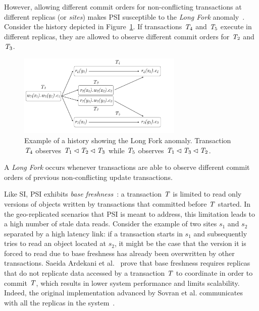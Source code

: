 However, allowing different commit orders for non-conflicting transactions at different replicas (or \emph{sites}) makes PSI susceptible to the \emph{Long Fork} anomaly~\citep{psi-intro}. Consider the history depicted in Figure~\ref{fig:long_fork_history}. If transactions $\mathit{T}_4$ and $\mathit{T}_5$ execute in different replicas, they are allowed to observe different commit orders for $\mathit{T}_2$ and $\mathit{T}_3$.

\begin{figure}[h]
  \centering
  \includegraphics[width=0.7\textwidth]{figures/long_fork_hist.pdf}
  \caption{Example of a history showing the Long Fork anomaly. Transaction $\mathit{T}_4$ observes $\mathit{T}_1 \lhd \mathit{T}_2 \lhd \mathit{T}_3$ while $\mathit{T}_5$ observes $\mathit{T}_1 \lhd \mathit{T}_3 \lhd \mathit{T}_2$.}
  \label{fig:long_fork_history}
\end{figure}

\begin{definition}
A \emph{Long Fork} occurs whenever transactions are able to observe different commit orders of previous non-conflicting update transactions.
\end{definition}

Like SI, PSI exhibits \emph{base freshness}~\citep{ardekani_freshness}: a transaction $\mathit{T}$ is limited to read only versions of objects written by transactions that committed before $\mathit{T}$ started. In the geo-replicated scenarios that PSI is meant to address, this limitation leads to a high number of stale data reads. Consider the example of two sites $s_1$ and $s_2$ separated by a high latency link: if a transaction starts in $s_1$ and subsequently tries to read an object located at $s_2$, it might be the case that the version it is forced to read due to base freshness has already been overwritten by other transactions. Saeida Ardekani et al.~\citep[Theorem 4]{ardekani_si_limits} prove that base freshness requires replicas that do not replicate data accessed by a transaction $\mathit{T}$ to coordinate in order to commit $\mathit{T}$, which results in lower system performance and limits scalability. Indeed, the original implementation advanced by Sovran et al. communicates with all the replicas in the system~\citep{psi-intro}.

